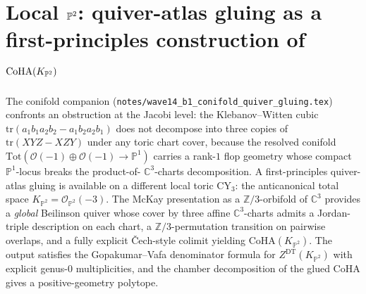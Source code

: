 \section{Local $\bP^2$: quiver-atlas gluing as a first-principles construction
of $\CoHA(K_{\bP^2})$}
\label{wn:wave14-b2-local-P2-gluing}

\providecommand{\ClaimStatusTheorem}{\textsc{[theorem, cited]}}
\providecommand{\ClaimStatusConjectured}{\textsc{[conjectural]}}
\providecommand{\ClaimStatusDefinition}{\textsc{[definition]}}
\providecommand{\ClaimStatusDerivation}{\textsc{[first-principles derivable]}}
\providecommand{\ClaimStatusHeuristic}{\textsc{[heuristic]}}
\providecommand{\ClaimStatusOpen}{\textsc{[open]}}
\providecommand{\CoHA}{\mathrm{CoHA}}
\providecommand{\Wilpha}{\mathcal{W}_{1+\infty}}
\providecommand{\gghone}{\widehat{\mathfrak{gl}}_1}
\providecommand{\gghN}{\widehat{\mathfrak{gl}}_N}
\providecommand{\Hilb}{\mathrm{Hilb}}
\providecommand{\Coh}{\mathrm{Coh}}
\providecommand{\Rep}{\mathrm{Rep}}
\providecommand{\Perf}{\mathrm{Perf}}
\providecommand{\Crit}{\mathrm{Crit}}
\providecommand{\DT}{\mathrm{DT}}
\providecommand{\GV}{\mathrm{GV}}
\providecommand{\chiGV}{\chi_{\mathrm{GV}}}
\providecommand{\cE}{\mathcal{E}}
\providecommand{\cO}{\mathcal{O}}
\providecommand{\cM}{\mathcal{M}}
\providecommand{\cH}{\mathcal{H}}
\providecommand{\bP}{\mathbb{P}}
\providecommand{\bC}{\mathbb{C}}
\providecommand{\bZ}{\mathbb{Z}}
\providecommand{\bF}{\mathbb{F}}

The conifold companion (\texttt{notes/wave14\_b1\_conifold\_quiver\_gluing.tex})
confronts an obstruction at the Jacobi level: the Klebanov--Witten cubic
$\mathrm{tr}(a_1 b_1 a_2 b_2 - a_1 b_2 a_2 b_1)$ does not decompose into
three copies of $\mathrm{tr}(XYZ-XZY)$ under any toric chart cover, because
the resolved conifold $\mathrm{Tot}(\cO(-1)\oplus\cO(-1)\to\bP^1)$ carries a
rank-$1$ flop geometry whose compact $\bP^1$-locus breaks the product-of-
$\bC^3$-charts decomposition. A first-principles quiver-atlas gluing is
available on a different local toric CY$_3$: the anticanonical total space
$K_{\bP^2}=\cO_{\bP^2}(-3)$. The McKay presentation as a $\bZ/3$-orbifold
of $\bC^3$ provides a \emph{global} Beilinson quiver whose cover by three
affine $\bC^3$-charts admits a Jordan-triple description on each chart, a
$\bZ/3$-permutation transition on pairwise overlaps, and a fully explicit
\v Cech-style colimit yielding $\CoHA(K_{\bP^2})$. The output satisfies
the Gopakumar--Vafa denominator formula for $Z^\DT(K_{\bP^2})$ with
explicit genus-$0$ multiplicities, and the chamber decomposition of the
glued CoHA gives a positive-geometry polytope.

